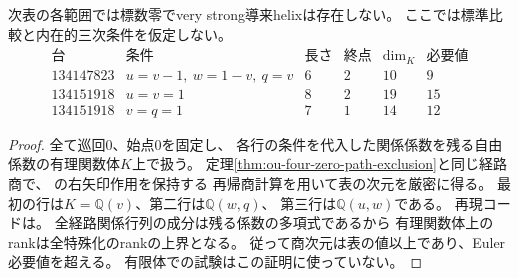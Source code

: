 \begin{theorem}[四零の残余三境界の経路商による排除]
\label{thm:ou-four-zero-boundary-paths}
次表の各範囲では標数零でvery strong導来helixは存在しない。
ここでは標準比較と内在的三次条件を仮定しない。
\[
\begin{array}{r|l|c|c|c|c}
\text{台}&\text{条件}&\text{長さ}&\text{終点}&\dim_K&\text{必要値}\\\hline
134147823&u=v-1,\ w=1-v,\ q=v&6&2&10&9\\
134151918&u=v=1&8&2&19&15\\
134151918&v=q=1&7&1&14&12
\end{array}
\]
\end{theorem}
\begin{proof}
全て巡回0、始点0を固定し、
各行の条件を代入した関係係数を残る自由係数の有理関数体$K$上で扱う。
定理\ref{thm:ou-four-zero-path-exclusion}と同じ経路商で、
の右矢印作用を保持する
再帰商計算を用いて表の次元を厳密に得る。
最初の行は$K=\mathbb Q(v)$、第二行は$\mathbb Q(w,q)$、
第三行は$\mathbb Q(u,w)$である。
再現コードは。
全経路関係行列の成分は残る係数の多項式であるから
有理関数体上のrankは全特殊化のrankの上界となる。
従って商次元は表の値以上であり、Euler必要値を超える。
有限体での試験はこの証明に使っていない。
\end{proof}

